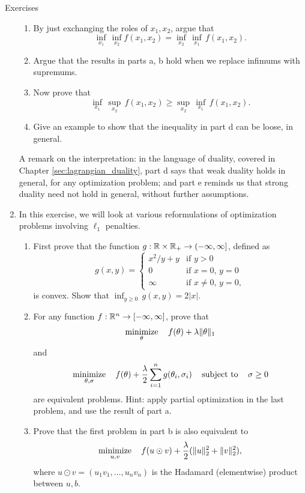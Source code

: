 \begin{xcb}{Exercises}
\begin{enumerate}[label=\thechapter.\arabic*]
\begin{enumerate}[label=\alph*.]
\item By just exchanging the roles of $x_1,x_2$, argue that 
  \[
  \inf_{x_1} \, \inf_{x_2} f(x_1, x_2) = \inf_{x_2} \, \inf_{x_1} \, f(x_1, x_2). 
  \]

\item Argue that the results in parts a, b hold when we replace infimums with 
  supremums. 

\item Now prove that 
  \[
  \inf_{x_1} \, \sup_{x_2} \, f(x_1, x_2) \geq \sup_{x_2} \, \inf_{x_1} \,
  f(x_1,x_2). 
  \]

\item Give an example to show that the inequality in part d can be loose, in
  general. 
\end{enumerate}

\smallskip
A remark on the interpretation: in the language of duality, covered in Chapter
\ref{sec:lagrangian_duality}, part d says that weak duality holds in general,
for any optimization problem; and part e reminds us that strong duality need not 
hold in general, without further assumptions.    

\item In this exercise, we will look at various reformulations of optimization
  problems involving $\ell_1$ penalties.
  
\begin{enumerate}[label=\alph*.]
\item First prove that the function $g : \mathbb{R} \times \mathbb{R}_+ \to (-\infty,\infty]$, 
  defined as  
  \[
  g(x,y) = \begin{cases}
  x^2/y + y & \text{if $y > 0$} \\
  0 & \text{if $x=0, \, y=0$} \\
  \infty & \text{if $x\not=0, \, y=0$},
  \end{cases}
  \]
  is convex. Show that $\inf_{y \geq 0} \, g(x,y) = 2|x|$. 

\item For any function $f : \mathbb{R}^n \to [-\infty,\infty]$, prove that 
  \[
  \operatorname*{minimize}_\theta \quad f(\theta) + \lambda \|\theta\|_1 
  \]
  and 
  \[
  \operatorname*{minimize}_{\theta, \sigma} \quad f(\theta) + \frac{\lambda}{2} \sum_{i=1}^n 
  g(\theta_i, \sigma_i) \quad \operatorname{subject\,\,to} \quad \sigma \geq 0
  \]
  are equivalent problems. Hint: apply partial optimization in the last problem,  
  and use the result of part a.

\item Prove that the first problem in part b is also equivalent to 
  \[
  \operatorname*{minimize}_{u,v} \quad f(u \odot v) + \frac{\lambda}{2} (\|u\|_2^2 +
  \|v\|_2^2), 
  \]
  where $u \odot v = (u_1v_1, \dots, u_nv_n)$ is the Hadamard
  (elementwise) product between $u,b$. 


\end{enumerate}
\end{enumerate}
\end{xcb}
